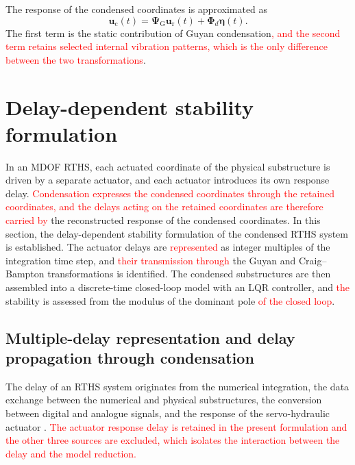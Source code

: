 \documentclass[11pt,a4paper]{article}
\numberwithin{equation}{section}
\newcommand{\rev}[1]{\textcolor{red}{#1}}
\begin{document}
The response of the condensed coordinates is approximated as
\begin{equation}
	\bm{u}_{\mathrm{c}}(t)=
	\bm{\Psi}_{\mathrm{G}}\bm{u}_{\mathrm{r}}(t)
	+\bm{\Phi}_{d}\bm{\eta}(t).
	\label{eq:cb-internal-recovery}
\end{equation}
The first term is the static contribution of Guyan condensation\rev{, and the second term retains selected internal vibration patterns, which is the only difference between the two transformations}.


\section{Delay-dependent stability formulation} \label{sec3}

In an MDOF RTHS, each actuated coordinate of the physical substructure is driven by a separate actuator, and each actuator introduces its own response delay. \rev{Condensation expresses the condensed coordinates through the retained coordinates, and the delays acting on the retained coordinates are therefore carried by} the reconstructed response of the condensed coordinates. In this section, the delay-dependent stability formulation of the condensed RTHS system is established. The actuator delays are \rev{represented} as integer multiples of the integration time step, and \rev{their transmission through} the Guyan and Craig--Bampton transformations is identified. The condensed substructures are then assembled into a discrete-time closed-loop model with an LQR controller, and \rev{the} stability is assessed from the modulus of the dominant pole \rev{of the closed loop}.

\subsection{Multiple-delay representation and delay propagation through condensation}
\label{sec:multiple-delay}

The delay of an RTHS system originates from the numerical integration, the data exchange between the numerical and physical substructures, the conversion between digital and analogue signals, and the response of the servo-hydraulic actuator \cite{Carrion2007}. \rev{The actuator response delay is retained in the present formulation and the other three sources are excluded, which isolates the interaction between the delay and the model reduction.}
\end{document}
